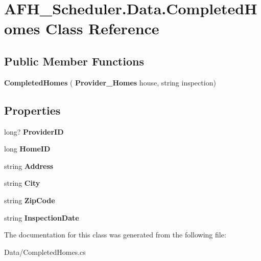 \section{A\+F\+H\+\_\+\+Scheduler.\+Data.\+Completed\+Homes Class Reference}
\label{class_a_f_h___scheduler_1_1_data_1_1_completed_homes}
\subsection*{Public Member Functions}
\begin{DoxyCompactItemize}
\item 
\mbox{\label{class_a_f_h___scheduler_1_1_data_1_1_completed_homes_a3927d41e28466b21570f24637ce03954}} 
{\bfseries Completed\+Homes} (\textbf{ Provider\+\_\+\+Homes} house, string inspection)
\end{DoxyCompactItemize}
\subsection*{Properties}
\begin{DoxyCompactItemize}
\item 
\mbox{\label{class_a_f_h___scheduler_1_1_data_1_1_completed_homes_a3283200fd2d066562ecc60d0591f9c4d}} 
long? {\bfseries Provider\+ID}\hspace{0.3cm}{\ttfamily  [get, set]}
\item 
\mbox{\label{class_a_f_h___scheduler_1_1_data_1_1_completed_homes_a4812141a4cedf37ea1b8733a8ddfc7ce}} 
long {\bfseries Home\+ID}\hspace{0.3cm}{\ttfamily  [get, set]}
\item 
\mbox{\label{class_a_f_h___scheduler_1_1_data_1_1_completed_homes_aad305a6ba268cad6fe573d1e30b1d1db}} 
string {\bfseries Address}\hspace{0.3cm}{\ttfamily  [get, set]}
\item 
\mbox{\label{class_a_f_h___scheduler_1_1_data_1_1_completed_homes_a0be595792b40b9b79a29105599226c36}} 
string {\bfseries City}\hspace{0.3cm}{\ttfamily  [get, set]}
\item 
\mbox{\label{class_a_f_h___scheduler_1_1_data_1_1_completed_homes_aaf994402bd6e875f7e94e6717a496a0b}} 
string {\bfseries Zip\+Code}\hspace{0.3cm}{\ttfamily  [get, set]}
\item 
\mbox{\label{class_a_f_h___scheduler_1_1_data_1_1_completed_homes_a7b7319bcaa19dddb1e202a62cf65598c}} 
string {\bfseries Inspection\+Date}\hspace{0.3cm}{\ttfamily  [get, set]}
\end{DoxyCompactItemize}


The documentation for this class was generated from the following file\+:\begin{DoxyCompactItemize}
\item 
Data/Completed\+Homes.\+cs\end{DoxyCompactItemize}
